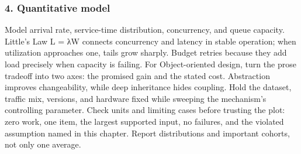 \subsubsection*{4. Quantitative model}
Model arrival rate, service-time distribution, concurrency, and queue capacity. Little's Law L = λW connects concurrency and latency in stable operation; when utilization approaches one, tails grow sharply. Budget retries because they add load precisely when capacity is failing.
For Object-oriented design, turn the prose tradeoff into two axes: the promised gain and the stated cost. Abstraction improves changeability, while deep inheritance hides coupling. Hold the dataset, traffic mix, versions, and hardware fixed while sweeping the mechanism's controlling parameter.
Check units and limiting cases before trusting the plot: zero work, one item, the largest supported input, no failures, and the violated assumption named in this chapter. Report distributions and important cohorts, not only one average.
